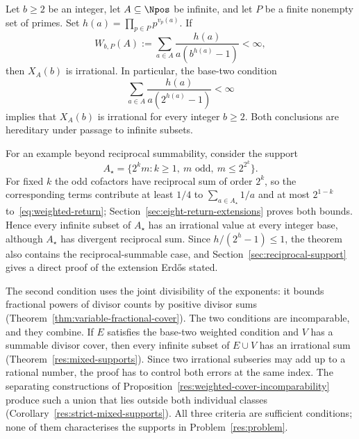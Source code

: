 \documentclass[11pt]{article}
\begin{document}
\begin{theorem}
\label{res:weighted-support}
Let $b\ge2$ be an integer, let $A\subseteq\Npos$ be infinite, and let $P$
be a finite nonempty set of primes.  Set
$h(a)=\prod_{p\in P}p^{v_p(a)}$.  If
\begin{equation}\label{eq:weighted-fixed-base}
 W_{b,P}(A):=\sum_{a\in A}
 \frac{h(a)}{a(b^{h(a)}-1)}<\infty,
\end{equation}
then $X_A(b)$ is irrational.  In particular, the base-two condition
\begin{equation*}\label{eq:weighted-return}
 \sum_{a\in A}\frac{h(a)}{a(2^{h(a)}-1)}<\infty
 \tag{W}
\end{equation*}
implies that $X_A(b)$ is irrational for every integer $b\ge2$.  Both
conclusions are hereditary under passage to infinite subsets.
\end{theorem}

For an example beyond reciprocal summability, consider the support
\[
 A_\star=\{2^km:k\ge1,\ m\text{ odd},\ m\le2^{2^k}\}.
\]
For fixed $k$ the odd cofactors have reciprocal sum of order $2^k$, so
the corresponding terms contribute at least $1/4$ to
$\sum_{a\in A_\star}1/a$ and at most $2^{1-k}$
to~\eqref{eq:weighted-return}; Section~\ref{sec:eight-return-extensions}
proves both bounds. Hence every infinite subset of $A_\star$ has an
irrational value at every integer base, although $A_\star$ has divergent
reciprocal sum. Since $h/(2^h-1)\le1$, the theorem also contains the
reciprocal-summable case, and Section~\ref{sec:reciprocal-support}
gives a direct proof of the extension Erd\H{o}s stated.

The second condition uses the joint divisibility of the exponents: it
bounds fractional powers of divisor counts by positive divisor sums
(Theorem~\ref{thm:variable-fractional-cover}). The two conditions are
incomparable, and they combine. If $E$ satisfies the base-two weighted
condition and $V$ has a summable divisor cover, then every infinite
subset of $E\cup V$ has an irrational sum
(Theorem~\ref{res:mixed-supports}). Since two irrational subseries may
add up to a rational number, the proof has to control both errors at
the same index. The separating constructions of
Proposition~\ref{res:weighted-cover-incomparability} produce such a
union that lies outside both individual classes
(Corollary~\ref{res:strict-mixed-supports}). All three criteria are
sufficient conditions; none of them characterises the supports in
Problem~\ref{res:problem}.
\end{document}
